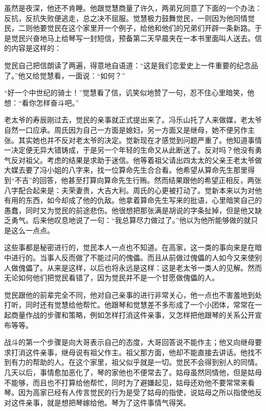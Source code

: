 \par 虽然是夜深，他还不肯睡。他跟觉慧商量了许久，两弟兄同意了下面的一个办法：反抗，反抗失败便逃走，总之决不屈服。觉慧极力鼓舞觉民，一则因为他同情觉民，二则他要觉民在这个家里开一个例子，给他和他们的兄弟们开辟一条新路。于是觉民兴奋地马上给琴写一封短信，预备第二天早晨夹在一本书里面叫人送去。信的内容是这样的：
\par 觉民自己把信朗读了两遍，得意地自语道：“这是我们恋爱史上一件重要的纪念品了。”他又给觉慧看，一面说：“如何？”
\par “好一个中世纪的骑士！”觉慧看了信，讥笑似地赞了一句，忍不住心里暗笑，他想：“看你怎样奋斗吧。”
\par 老太爷的寿辰刚过去，觉民的亲事就正式提出来了。冯乐山托了人来做媒，老太爷自然一口应承。周氏因为自己一方面是媳妇，另一方面又是继母，她不便另作主张。其实她也并不反对老太爷的决定。觉新现在才感觉到问题严重了。他知道事情一决定便无异大错铸成，于是另一个年轻的生命又从此断送了。反对吗？他没有勇气反对祖父。考虑的结果是求助于迷信。他等着祖父请出四太太的父亲王老太爷做大媒去要了冯小姐的八字来，找一位算命先生合合看。他希望从算命先生那里得到“不吉”的回答，他甚至打算向算命先生行贿。然而结果跟他的希望正相反，两张八字配合起来是：夫荣妻贵，大吉大利。周氏的心更被打动了。觉新本来以为对他有用的东西，如今却成了他的仇敌。他拿着算命先生写来的批语，心里暗笑自己的愚蠢，同时又为觉民的前途悲伤。他很想把那张满是胡说的字条扯掉，但是他又缺乏勇气。后来他叹息地说了一句：“我总算尽力做过了。”他以为他所能够做的就只是这么一点点。
\par 这些事都是秘密进行的，觉民本人一点也不知道。在高家，这一类的事向来是在暗中进行的。当事人反而做了不能过问的傀儡。而且从前做过傀儡的人如今又来使别人做傀儡了。从来是这样，以后也将永远是这样：这是老太爷一类人的见解。然而无论如何他们把觉民看错了，因为觉民并不是一个甘愿做傀儡的人。
\par 觉民跟他的前辈完全不同，他对自己亲事的进行非常关心，他一点也不害羞地到处打听，同时还有觉慧给他帮忙。他跟琴和觉慧差不多形成了一个小团体，常常在一起商量作战的步骤和策略，例如怎样打消这件亲事，又怎样把他跟琴的关系公开宣布等等。
\par 战斗的第一个步骤是向大哥表示自己的态度，大哥回答说不能作主；他又向继母要求打消这件亲事，继母说有祖父作主。祖父那方面，他却不能直接去讲话。他找不到有力的帮助的人。在这个家里，祖父似乎就是一切。觉民不会得到别人的同情。几天以后，事情愈加恶化了，琴的家他也不便常去了。姑母虽然同情他，但是姑母不能够，而且也不打算给他帮忙，同时为了避嫌起见，姑母还劝他不要常常来看琴。因为高家已经有人传言觉民的行为是受了姑母的指使，说姑母之所以指使他反对这件亲事，就是想把琴嫁给他。琴为了这件事情气得哭。
